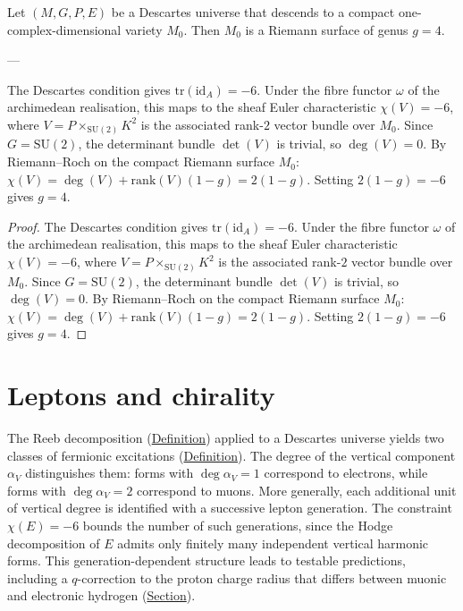 \begin{proposition}
  \label{prop:genus-maximal-descent}
Let $(M, G, P, E)$ be a Descartes universe that descends to a compact
one-complex-dimensional variety $M_0$.  Then $M_0$ is a Riemann surface of
genus $g = 4$.

---

The Descartes condition gives $\mathrm{tr}(\mathrm{id}_A) = -6$.  Under the fibre functor $\omega$ of the archimedean realisation, this maps to the sheaf Euler characteristic $\chi(V) = -6$, where $V = P \times_{\mathrm{SU}(2)} K^2$ is the associated rank-$2$ vector bundle over $M_0$.  Since $G = \mathrm{SU}(2)$, the determinant bundle $\det(V)$ is trivial, so $\deg(V) = 0$.  By Riemann--Roch on the compact Riemann surface $M_0$: $\chi(V) = \deg(V) + \mathrm{rank}(V)(1-g) = 2(1-g)$.  Setting $2(1-g) = -6$ gives $g = 4$.
\end{proposition}
\begin{proof}
The Descartes condition gives $\mathrm{tr}(\mathrm{id}_A) = -6$.  Under the fibre functor $\omega$ of the archimedean realisation, this maps to the sheaf Euler characteristic $\chi(V) = -6$, where $V = P \times_{\mathrm{SU}(2)} K^2$ is the associated rank-$2$ vector bundle over $M_0$.  Since $G = \mathrm{SU}(2)$, the determinant bundle $\det(V)$ is trivial, so $\deg(V) = 0$.  By Riemann--Roch on the compact Riemann surface $M_0$: $\chi(V) = \deg(V) + \mathrm{rank}(V)(1-g) = 2(1-g)$.  Setting $2(1-g) = -6$ gives $g = 4$.
\end{proof}

\section{Leptons and chirality}
\label{sec:descartes-leptons-chirality}

\begin{remark}
  \label{rem:descartes-leptons}
The Reeb decomposition (\hyperref[def:reeb-decomposition]{Definition}) applied to
a Descartes universe yields two classes of fermionic excitations
(\hyperref[def:fermion]{Definition}).  The degree of the vertical component
$\alpha_V$ distinguishes them: forms with $\deg\alpha_V = 1$ correspond to
electrons, while forms with $\deg\alpha_V = 2$ correspond to muons.  More
generally, each additional unit of vertical degree is identified with a
successive lepton generation.  The constraint $\chi(E) = -6$ bounds the
number of such generations, since the Hodge decomposition of $E$ admits only
finitely many independent vertical harmonic forms.  This
generation-dependent structure leads to testable predictions, including a
$q$-correction to the proton charge radius that differs between muonic and
electronic hydrogen (\hyperref[ssec:proton-radius]{Section}).
\end{remark}

